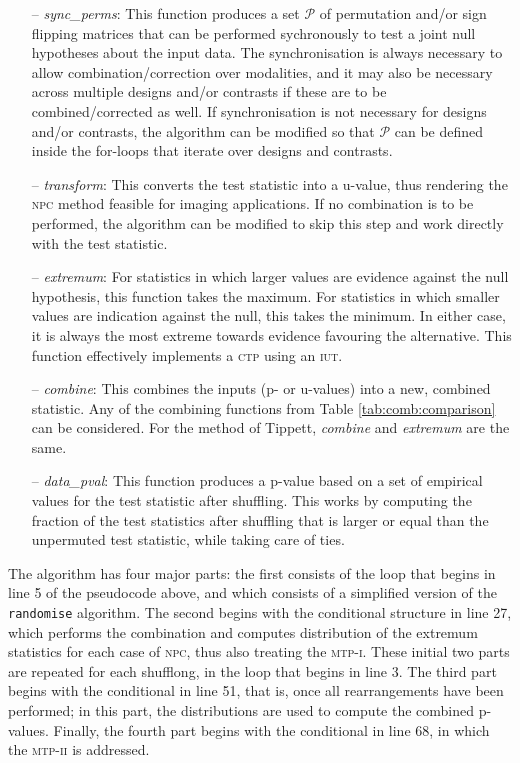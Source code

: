 \begin{itemize}
\item[--] \emph{sync\_perms}: This function produces a set $\mathcal{P}$ of permutation and/or sign flipping matrices that can be performed sychronously to test a joint null hypotheses about the input data. The synchronisation is always necessary to allow combination/correction over modalities, and it may also be necessary across multiple designs and/or contrasts if these are to be combined/corrected as well. If synchronisation is not necessary for designs and/or contrasts, the algorithm can be modified so that $\mathcal{P}$ can be defined inside the for-loops that iterate over designs and contrasts.
\item[--] \emph{transform}: This converts the test statistic into a u-value, thus rendering the \textsc{npc} method feasible for imaging applications. If no combination is to be performed, the algorithm can be modified to skip this step and work directly with the test statistic.
\item[--] \emph{extremum}: For statistics in which larger values are evidence against the null hypothesis, this function takes the maximum. For statistics in which smaller values are indication against the null, this takes the minimum. In either case, it is always the most extreme towards evidence favouring the alternative. This function effectively implements a \textsc{ctp} using an \textsc{iut}.
\item[--] \emph{combine}: This combines the inputs (p- or u-values) into a new, combined statistic. Any of the combining functions from Table \ref{tab:comb:comparison} can be considered. For the method of Tippett, \emph{combine} and \emph{extremum} are the same.
\item[--] \emph{data\_pval}: This function produces a p-value based on a set of empirical values for the test statistic after shuffling. This works by computing the fraction of the test statistics after shuffling that is larger or equal than the unpermuted test statistic, while taking care of ties.
\end{itemize}

The algorithm has four major parts: the first consists of the loop that begins in line 5 of the pseudocode above, and which consists of a simplified version of the \texttt{randomise} algorithm. The second begins with the conditional structure in line 27, which performs the combination and computes distribution of the extremum statistics for each case of \textsc{npc}, thus also treating the \textsc{mtp-i}. These initial two parts are repeated for each shufflong, in the loop that begins in line 3. The third part begins with the conditional in line 51, that is, once all rearrangements have been performed; in this part, the distributions are used to compute the combined p-values. Finally, the fourth part begins with the conditional in line 68, in which the \textsc{mtp-ii} is addressed.

